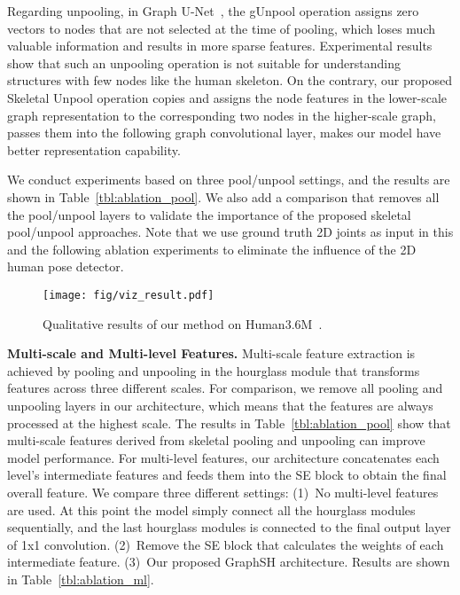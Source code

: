 \documentclass[final]{cvpr}
\begin{document}
Regarding unpooling, in Graph U-Net~\cite{gao2019graph}, the gUnpool operation assigns zero vectors to nodes that are not selected at the time of pooling, 
which loses much valuable information and results in more sparse features. Experimental results show that such an unpooling operation is not suitable for understanding structures with few nodes like the human skeleton.
On the contrary, our proposed Skeletal Unpool operation copies and assigns the node features in the lower-scale graph representation to the corresponding two nodes in the higher-scale graph, passes them into the following graph convolutional layer, makes our model have better representation capability.

We conduct experiments based on three pool/unpool settings, and the results are shown in Table~\ref{tbl:ablation_pool}. We also add a comparison that removes all the pool/unpool layers to validate the importance of the proposed skeletal pool/unpool approaches.
Note that we use ground truth 2D joints as input in this and the following ablation experiments to eliminate the influence of the 2D human pose detector.

\begin{figure*}
\begin{center}
\texttt{[image: fig/viz\_result.pdf]}
\end{center}
   \caption{Qualitative results of our method on Human3.6M~\cite{ionescu2013human3}.}
\label{fig:viz_result}
\end{figure*}

\textbf{Multi-scale and Multi-level Features.}
Multi-scale feature extraction is achieved by pooling and unpooling in the hourglass module that transforms features across three different scales. 
For comparison, we remove all pooling and unpooling layers in our architecture, which means that the features are always processed at the highest scale.
The results in Table~\ref{tbl:ablation_pool} show that multi-scale features derived from skeletal pooling and unpooling can improve model performance.
For multi-level features, our architecture concatenates each level's intermediate features and feeds them into the SE block to obtain the final overall feature.
We compare three different settings:
(1)~No multi-level features are used. At this point the model simply connect all the hourglass modules sequentially, and the last hourglass modules is connected to the final output layer of 1x1 convolution.
(2)~Remove the SE block that calculates the weights of each intermediate feature.
(3)~Our proposed GraphSH architecture.
Results are shown in Table~\ref{tbl:ablation_ml}.
\end{document}
